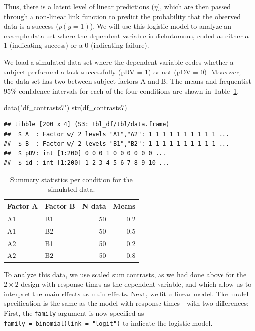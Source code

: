 \documentclass[
  12pt,
]{krantz}
\newenvironment{Shaded}{\begin{snugshade}}{\end{snugshade}}
\newcommand{\FunctionTok}[1]{\textcolor[rgb]{0.00,0.00,0.00}{#1}}
\newcommand{\NormalTok}[1]{#1}
\newcommand{\StringTok}[1]{\textcolor[rgb]{0.31,0.60,0.02}{#1}}
\theoremstyle{definition}
\theoremstyle{definition}
\theoremstyle{definition}
\theoremstyle{definition}
\theoremstyle{remark}
\begin{document}
Thus, there is a latent level of linear predictions (\(\eta\)), which are then passed through a non-linear link function to predict the probability that the observed data is a success (\(p(y = 1)\)). We will use this logistic model to analyze an example data set where the dependent variable is dichotomous, coded as either a 1 (indicating success) or a 0 (indicating failure).

We load a simulated data set where the dependent variable codes whether a subject performed a task successfully (pDV = 1) or not (pDV = 0). Moreover, the data set has two between-subject factors A and B. The means and frequentist 95\% confidence intervals for each of the four conditions are shown in Table~\ref{tab:cTab7Means}.

\begin{Shaded}
\begin{Highlighting}[]
\FunctionTok{data}\NormalTok{(}\StringTok{"df\_contrasts7"}\NormalTok{)}
\FunctionTok{str}\NormalTok{(df\_contrasts7)}
\end{Highlighting}
\end{Shaded}

\begin{verbatim}
## tibble [200 x 4] (S3: tbl_df/tbl/data.frame)
##  $ A  : Factor w/ 2 levels "A1","A2": 1 1 1 1 1 1 1 1 1 1 ...
##  $ B  : Factor w/ 2 levels "B1","B2": 1 1 1 1 1 1 1 1 1 1 ...
##  $ pDV: int [1:200] 0 0 0 1 0 0 0 0 0 0 ...
##  $ id : int [1:200] 1 2 3 4 5 6 7 8 9 10 ...
\end{verbatim}

\begin{table}[h]

\caption{\label{tab:cTab7Means}Summary statistics per condition for the simulated data.}
\centering
\begin{tabular}[t]{llrr}
\toprule
Factor A & Factor B & N data & Means\\
\midrule
A1 & B1 & 50 & 0.2\\
A1 & B2 & 50 & 0.5\\
A2 & B1 & 50 & 0.2\\
A2 & B2 & 50 & 0.8\\
\bottomrule
\end{tabular}
\end{table}

To analyze this data, we use scaled sum contrasts, as we had done above for the \(2 \times 2\) design with response times as the dependent variable, and which allow us to interpret the main effects as main effects. Next, we fit a linear model. The model specification is the same as the model with response times - with two differences: First, the \texttt{family} argument is now specified as \texttt{family\ =\ binomial(link\ =\ "logit")} to indicate the logistic model.
\end{document}
